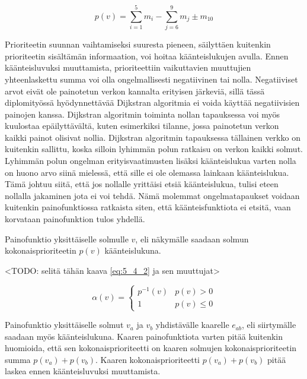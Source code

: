   \begin{equation} \label{eq:5_4_1}
    p(v) = \sum\limits_{i=1}^{5} m_i - \sum\limits_{j=6}^{9} m_j \pm m_{10}
  \end{equation}

  Prioriteetin suunnan vaihtamiseksi suuresta pieneen, säilyttäen kuitenkin prioriteetin sisältämän informaation, voi hoitaa käänteislukujen avulla.
  Ennen käänteisluvuksi muuttamista, prioriteettiin vaikuttavien muuttujien yhteenlaskettu summa voi olla ongelmallisesti negatiivinen tai nolla.
  Negatiiviset arvot eivät ole painotetun verkon kannalta erityisen järkeviä, sillä tässä diplomityössä hyödynnettävää Dijkstran algoritmia ei voida käyttää negatiivisien painojen kanssa.
  Dijkstran algoritmin toiminta nollan tapauksessa voi myös kuulostaa epäilyttävältä, kuten esimerkiksi tilanne, jossa painotetun verkon kaikki painot olisivat nollia.
  Dijkstran algoritmin tapauksessa tällainen verkko on kuitenkin sallittu, koska silloin lyhimmän polun ratkaisu on verkon kaikki solmut.
  Lyhimmän polun ongelman erityisvaatimusten lisäksi käänteislukua varten nolla on huono arvo siinä mielessä, että sille ei ole olemassa lainkaan käänteislukua.
  Tämä johtuu siitä, että jos nollalle yrittäisi etsiä käänteislukua, tulisi eteen nollalla jakaminen jota ei voi tehdä.
  Nämä molemmat ongelmatapaukset voidaan kuitenkin painofunktiossa ratkaista siten, että käänteisfunktiota ei etsitä, vaan korvataan painofunktion tulos yhdellä.

  Painofunktio yksittäiselle solmulle \(v\), eli näkymälle saadaan solmun kokonaisprioriteetin \(p(v)\) käänteislukuna.

  <TODO: selitä tähän kaava \ref{eq:5_4_2} ja sen muuttujat>

  \begin{equation} \label{eq:5_4_2}
    \alpha(v) = \begin{cases}
      p^{-1}(v) & p(v) > 0 \\
      1 & p(v) \leq 0
    \end{cases}
  \end{equation}

  Painofunktio yksittäiselle solmut \(v_a\) ja \(v_b\) yhdistävälle kaarelle \(e_{ab}\), eli siirtymälle saadaan myös käänteislukuna.
  Kaaren painofunktiota varten pitää kuitenkin huomioida, että sen kokonaisprioriteetti on kaaren solmujen kokonaisprioriteetin summa \(p(v_a) + p(v_b)\).
  Kaaren kokonaisprioriteetti \(p(v_a) + p(v_b)\) pitää laskea ennen käänteisluvuksi muuttamista.

